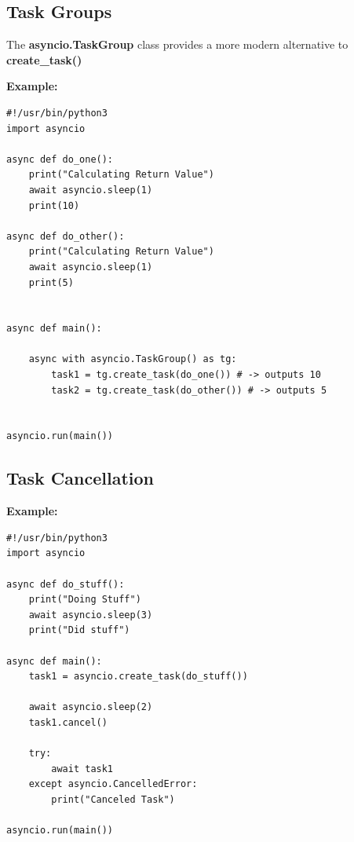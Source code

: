 \documentclass{report}
\begin{document}
    \pagebreak \bigbreak \noindent
    \bigbreak \noindent 
    \subsection{Task Groups}
    \bigbreak \noindent 
    The \textbf{asyncio.TaskGroup} class provides a more modern alternative to \textbf{create\_task()}
    \bigbreak \noindent 
    \begin{mdframed}
      \textbf{Example: }
      \begin{verbatim}
#!/usr/bin/python3
import asyncio

async def do_one():
    print("Calculating Return Value")
    await asyncio.sleep(1)
    print(10)

async def do_other():
    print("Calculating Return Value")
    await asyncio.sleep(1)
    print(5)


async def main():

    async with asyncio.TaskGroup() as tg:
        task1 = tg.create_task(do_one()) # -> outputs 10
        task2 = tg.create_task(do_other()) # -> outputs 5


asyncio.run(main())
      \end{verbatim}
    \end{mdframed}

    \pagebreak \bigbreak \noindent
    \subsection{Task Cancellation}
    \bigbreak \noindent 
    \begin{mdframed}
      \textbf{Example: }

      \begin{verbatim}
#!/usr/bin/python3
import asyncio

async def do_stuff():
    print("Doing Stuff")
    await asyncio.sleep(3)
    print("Did stuff")

async def main():
    task1 = asyncio.create_task(do_stuff())

    await asyncio.sleep(2)
    task1.cancel()

    try:
        await task1
    except asyncio.CancelledError:
        print("Canceled Task")

asyncio.run(main())
      \end{verbatim}
    \end{mdframed}

    \pagebreak \bigbreak \noindent
\end{document}
